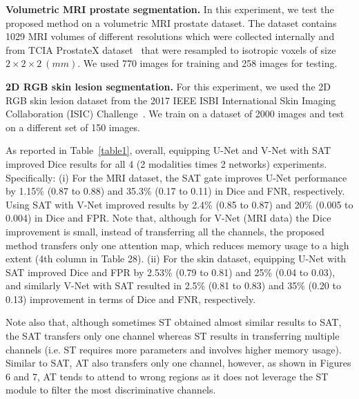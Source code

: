 \documentclass{article}
\begin{document}
\noindent \textbf{Volumetric MRI prostate segmentation.} In this experiment, we test the proposed method on a volumetric MRI prostate dataset. The dataset contains 1029 MRI volumes of different resolutions which were collected internally and from TCIA ProstateX dataset~\cite{ProstateX2017,litjens2014computer,clark2013cancer} that were resampled to isotropic voxels of size $2\times2\times2 \ (mm)$. We used 770 images for training and 258 images for testing.

\noindent \textbf{2D RGB skin lesion segmentation.} For this experiment, we used the 2D RGB skin lesion dataset from the 2017 IEEE ISBI International Skin Imaging Collaboration (ISIC) Challenge~\cite{codella2017skin}. We train on a dataset of 2000 images and test on a different set of 150 images.

As reported in Table~\ref{table1}, overall, equipping U-Net and V-Net with SAT improved Dice results for all  4 (2 modalities times 2 networks) experiments. Specifically: (i) For the MRI dataset, the SAT gate improves U-Net performance by 1.15\% (0.87 to 0.88) and 35.3\% (0.17 to 0.11) in Dice and FNR, respectively. Using SAT with V-Net improved results by 2.4\% (0.85 to 0.87) and 20\% (0.005 to 0.004) in Dice and FPR. Note that, although for V-Net (MRI data) the Dice improvement is small, instead of transferring all the channels, the proposed method transfers only one attention map, which reduces memory usage to a high extent (4th column in Table 28). (ii) For the skin dataset, equipping U-Net with SAT improved Dice and FPR by 2.53\% (0.79 to 0.81) and 25\% (0.04 to 0.03), and similarly V-Net with SAT resulted in 2.5\% (0.81 to 0.83) and 35\% (0.20 to 0.13) improvement in terms of Dice and FNR, respectively.

Note also that, although sometimes ST obtained almost similar results to SAT, the SAT transfers only one channel whereas ST results in transferring multiple channels (i.e. ST requires more parameters and involves higher memory usage). Similar to SAT, AT also transfers only one channel, however, as shown in Figures 6 and 7, AT tends to attend to wrong regions as it does not leverage the ST module to filter the most discriminative channels.
\end{document}
